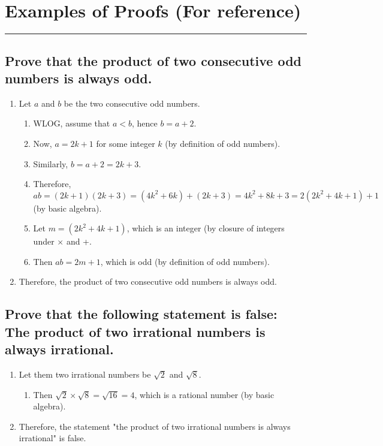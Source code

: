 \documentclass{article}
\begin{document}
	 
\newpage
\begingroup

\renewcommand{\labelenumii}{\arabic{enumi}.\arabic{enumii}}
\renewcommand{\labelenumiii}{\arabic{enumi}.\arabic{enumii}.\arabic{enumiii}}
\renewcommand{\labelenumiv}{\arabic{enumi}.\arabic{enumii}.\arabic{enumiii}.\arabic{enumiv}}

\section*{Examples of Proofs (For reference)}
\hrule
\vspace{0.5cm}

\subsection*{Prove that the product of two consecutive odd numbers is always odd.}
\begin{enumerate}
    \item Let $a$ and $b$ be the two consecutive odd numbers. 
    \begin{enumerate}
        \item WLOG, assume that $a<b$, hence $b=a+2$.
        \item Now, $a=2k+1$ for some integer $k$ (by definition of odd numbers).
        \item Similarly, $b=a+2=2k+3$.
        \item Therefore, $ab=(2k+1)(2k+3)=(4k^2+6k)+(2k+3)=4k^2+8k+3=2(2k^2+4k+1)+1$ (by basic algebra).
        \item Let $m=(2k^2+4k+1)$, which is an integer (by closure of integers under $\times$ and +. 
        \item Then $ab=2m+1$, which is odd (by definition of odd numbers).
    \end{enumerate}
    \item Therefore, the product of two consecutive odd numbers is always odd.
\end{enumerate}
\vspace{0.1cm}

\subsection*{Prove that the following statement is false: The product of two irrational numbers is always irrational.}
\begin{enumerate}
    \item Let them two irrational numbers be $\sqrt{2}$ and $\sqrt{8}$. 
    \begin{enumerate}
        \item Then $\sqrt{2}\times\sqrt{8}=\sqrt{16}=4$, which is a rational number (by basic algebra).
    \end{enumerate}
    \item Therefore, the statement "the product of two irrational numbers is always irrational" is false.
\end{enumerate}
\end{document}
